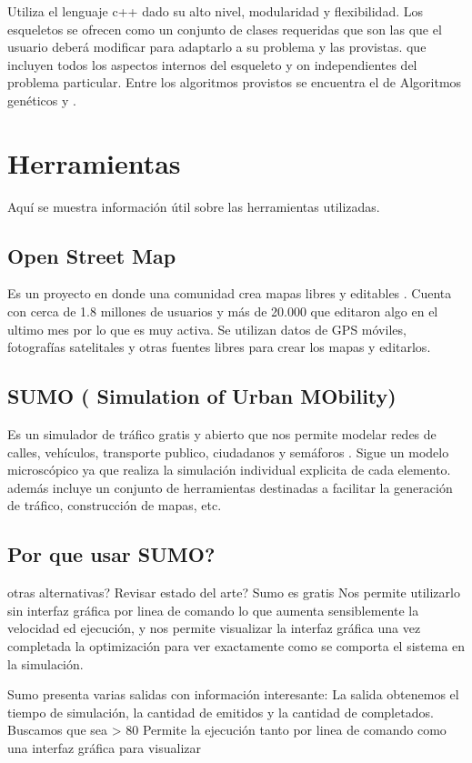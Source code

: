 Utiliza el lenguaje c++ dado su alto nivel, modularidad y flexibilidad. Los esqueletos se ofrecen como un conjunto de clases requeridas que son las que el usuario deberá modificar para adaptarlo a su problema y las provistas. que incluyen todos los aspectos internos del esqueleto y on independientes del problema particular. Entre los algoritmos provistos se encuentra el de Algoritmos genéticos y \citep{CHC}.



\section{Herramientas}
Aquí se muestra información útil sobre las herramientas utilizadas.

\subsection{Open Street Map} 
Es un proyecto en donde una comunidad crea mapas libres y editables \citep{OSM}. Cuenta con cerca de 1.8 millones de usuarios  y  más de 20.000 que editaron algo en el ultimo mes \citep{OSMSTATS} por lo que es muy activa. Se utilizan datos de GPS móviles, fotografías satelitales y otras fuentes libres para crear los mapas y editarlos. 

\subsection{SUMO ( Simulation of Urban MObility)}

Es un simulador de tráfico gratis y abierto que nos permite modelar redes de calles, vehículos, transporte publico, ciudadanos y semáforos \citep{SUMO}. Sigue un modelo microscópico ya que realiza la simulación individual explicita de cada elemento. además incluye un conjunto de herramientas destinadas  a facilitar la generación de tráfico, construcción de mapas, etc. 


\subsection{Por que usar SUMO? }
otras alternativas? Revisar estado del arte?
Sumo es gratis
Nos permite utilizarlo sin interfaz gráfica por linea de comando lo que aumenta sensiblemente la velocidad ed ejecución, y  nos permite visualizar la interfaz gráfica una vez completada la optimización para ver exactamente como se comporta el sistema en la simulación.

Sumo presenta varias salidas con información interesante: \citep{SUMOOUT} 
La salida obtenemos el tiempo de simulación, la cantidad de emitidos y la cantidad de completados. Buscamos que sea > 80%
Permite la ejecución tanto por linea de comando como una interfaz gráfica para visualizar


